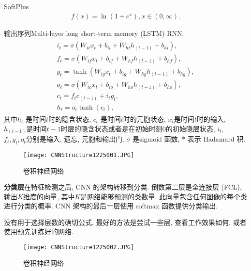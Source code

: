 SoftPlus \cite{glorot2011}
\begin{align}
    f (x)=\ln \left (1+e^{x}\right), x\in (0, \infty).
\end{align}

输出序列Multi-layer long short-term memory (LSTM) RNN.
\begin{align}
\begin{array}{l}
{i_{t}=\sigma\left (W_{i i} x_{t}+b_{i i}+W_{h i} h_{ (t-1)}+b_{h i}\right)}, \\
{f_{t}=\sigma\left (W_{i f} x_{t}+b_{i f}+W_{h f} h_{ (t-1)}+b_{h f}\right)}, \\
{g_{t}=\tanh \left (W_{i g} x_{t}+b_{i g}+W_{h g} h_{ (t-1)}+b_{h g}\right)}, \\
{o_{t}=\sigma\left (W_{i o} x_{t}+b_{i o}+W_{h o} h_{ (t-1)}+b_{h o}\right)}, \\
{c_{t}=f_{t}  c_{ (t-1)}+i_{t}  g_{t}}, \\
{h_{t}=o_{t}  \tanh \left (c_{t}\right)}.
\end{array}
\end{align}
其中$h_t$ 是时间$t$时的隐含状态, $c_t$ 是时间$t$时的元胞状态, $x_t$是时间$t$时的输入, $h_{ (t-1)}$是时间$t-1$时层的隐含状态或者是在初始时刻0的初始隐层状态,
$i_t$, $f_t, g_t, o_t$分别是输入, 遗忘, 元胞和输出门. $\sigma$ 是sigmoid 函数, $*$ 表示 Hadamard 积. 
\begin{figure}[H]
\centering
\texttt{[image: CNNStructure1225001.JPG]}
\caption{卷积神经网络}
\label{CNNStructure1225001}
\vspace{-0.4cm}
\end{figure}

\textbf{分类层}在特征检测之后, CNN 的架构转移到分类. 倒数第二层是全连接层 (FCL), 输出$K$维度的向量, 其中$K$是网络能够预测的类数量. 此向量包含任何图像的每个类进行分类的概率. CNN 架构的最后一层使用 softmax 函数提供分类输出.

\begin{remark}
    没有用于选择层数的确切公式. 最好的方法是尝试一些层, 查看工作效果如何, 或者使用预先训练好的网络.
\end{remark}
\begin{figure}[H]
\centering
\texttt{[image: CNNStructure1225002.JPG]}
\caption{卷积神经网络}
\label{CNNStructure1225002}
\vspace{-0.4cm}
\end{figure}

